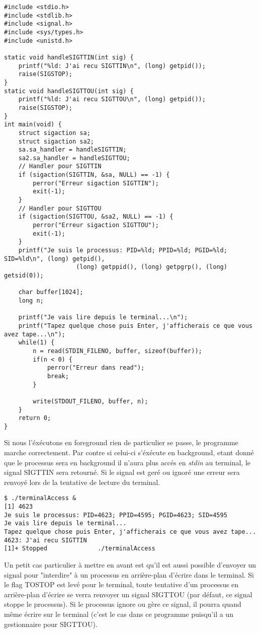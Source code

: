 \begin{lstlisting}[caption={terminalAccess.c}, label={terminalAccess.c}]
#include <stdio.h>
#include <stdlib.h>
#include <signal.h>
#include <sys/types.h>
#include <unistd.h>

static void handleSIGTTIN(int sig) {
	printf("%ld: J'ai recu SIGTTIN\n", (long) getpid());
	raise(SIGSTOP);
}
static void handleSIGTTOU(int sig) {
	printf("%ld: J'ai recu SIGTTOU\n", (long) getpid());
	raise(SIGSTOP);
}
int main(void) {
	struct sigaction sa;
	struct sigaction sa2;
	sa.sa_handler = handleSIGTTIN;
	sa2.sa_handler = handleSIGTTOU;
	// Handler pour SIGTTIN
	if (sigaction(SIGTTIN, &sa, NULL) == -1) {
    	perror("Erreur sigaction SIGTTIN");
    	exit(-1);
	}
	// Handler pour SIGTTOU
	if (sigaction(SIGTTOU, &sa2, NULL) == -1) {
    	perror("Erreur sigaction SIGTTOU");
    	exit(-1);
	}
	printf("Je suis le processus: PID=%ld; PPID=%ld; PGID=%ld; SID=%ld\n", (long) getpid(),
                	(long) getppid(), (long) getpgrp(), (long) getsid(0));
  	 
	char buffer[1024];
	long n;

	printf("Je vais lire depuis le terminal...\n");
	printf("Tapez quelque chose puis Enter, j'afficherais ce que vous avez tape...\n");
	while(1) {
    	n = read(STDIN_FILENO, buffer, sizeof(buffer));
    	if(n < 0) {
        	perror("Erreur dans read");
        	break;
    	}     	 
  	 
    	write(STDOUT_FILENO, buffer, n);
	}  
	return 0;
}
\end{lstlisting}

Si nous l'éxécutons en foreground rien de particulier se passe, le programme marche correctement. Par contre si celui-ci s'éxécute en background, etant donné que
le processus sera en background il n'aura plus accés en \textit{stdin} au terminal, le signal SIGTTIN sera retourné.
Si le signal est geré ou ignoré une erreur sera renvoyé lors de la tentative de lecture du terminal.
\begin{lstlisting}[style=blackstyle]
$ ./terminalAccess &
[1] 4623
Je suis le processus: PID=4623; PPID=4595; PGID=4623; SID=4595
Je vais lire depuis le terminal...
Tapez quelque chose puis Enter, j'afficherais ce que vous avez tape...
4623: J'ai recu SIGTTIN
[1]+ Stopped              ./terminalAccess
\end{lstlisting}

Un petit cas particulier à mettre en avant est qu'il est aussi possible d'envoyer un signal pour "interdire" à un processus en arrière-plan d'écrire dans le terminal. Si le flag TOSTOP est levé pour le terminal, 
toute tentative d'un processus en arrière-plan d'écrire se verra renvoyer un signal SIGTTOU (par défaut, ce signal stoppe le processus). Si le processus ignore ou gère ce signal, il pourra quand 
même écrire sur le terminal (c'est le cas dans ce programme puisqu'il a un gestionnaire pour SIGTTOU). 


